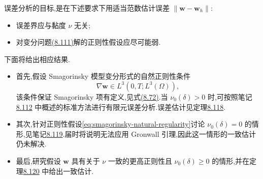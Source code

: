 \begin{note}[有限元误差分析的目标与概述]
\label{note:smagorinsky-fem-error-analysis-goals}
误差分析的目标,是在下述要求下用适当范数估计误差 $\|\bm{w}-\bm{w}_h\|$:
\begin{itemize}
  \item 误差界应与黏度 $\nu$ 无关;
  \item 对变分问题\hyperref[eq:smagorinsky-generalized-weak-form]{(8.111)}解的正则性假设应尽可能弱.
\end{itemize}
下面将给出相应结果.
\begin{itemize}
  \item 首先,假设 Smagorinsky 模型变分形式的自然正则性条件
  \begin{equation}\label{eq:smagorinsky-natural-regularity}
    \nabla\bm{w}\in L^3(0,T;L^3(\Omega)),
  \end{equation}
  该条件保证 Smagorinsky 项有定义,见式\hyperref[eq:smagorinsky-velocity-space]{(8.72)}.当 $\nu_0(\delta)>0$ 时,可按照笔记\hyperref[note:smagorinsky-fem-error-analysis-outline]{8.112} 中概述的标准方法进行有限元误差分析.误差估计见定理\hyperref[thm:smagorinsky-fem-error-estimate-standard]{8.118}.
  \item 其次,针对正则性假设\cref{eq:smagorinsky-natural-regularity}讨论 $\nu_0(\delta)=0$ 的情形,见笔记\hyperref[note:smagorinsky-error-regularity-case]{8.119}.届时将说明无法应用 Gronwall 引理,因此这一情形的一致估计仍未解决.
  \item 最后,研究假设 $\bm{w}$ 具有关于 $\nu$ 一致的更高正则性且 $\nu_0(\delta)\ge0$ 的情形,并在定理\hyperref[thm:smagorinsky-error-estimate-uniform]{8.120} 中给出一致估计.
\end{itemize}
\end{note}

